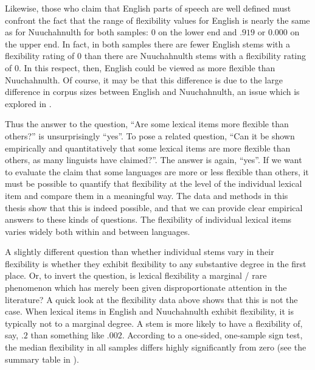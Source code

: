 Likewise, those who claim that English parts of speech are well defined must confront the fact that the range of flexibility values for English is nearly the same as for Nuuchahnulth for both samples: $0$ on the lower end and $.919$ or $0.000$ on the upper end. In fact, in both samples there are fewer English stems with a flexibility rating of $0$ than there are Nuuchahnulth stems with a flexibility rating of $0$. In this respect, then, English could be viewed as more flexible than Nuuchahnulth. Of course, it may be that this difference is due to the large difference in corpus sizes between English and Nuuchahnulth, an issue which is explored in .

Thus the answer to the question, \enquote{Are some lexical items more flexible than others?} is unsurprisingly \enquote{yes}. To pose a related question, \enquote{Can it be shown empirically and quantitatively that some lexical items are more flexible than others, as many linguists have claimed?}. The answer is again, \enquote{yes}. If we want to evaluate the claim that some languages are more or less flexible than others, it must be possible to quantify that flexibility at the level of the individual lexical item and compare them in a meaningful way. The data and methods in this thesis show that this is indeed possible, and that we can provide clear empirical answers to these kinds of questions. The flexibility of individual lexical items varies widely both within and between languages.

A slightly different question than whether individual stems vary in their flexibility is whether they exhibit flexibility to any substantive degree in the first place. Or, to invert the question, is lexical flexibility a marginal / rare phenomenon which has merely been given disproportionate attention in the literature? A quick look at the flexibility data above shows that this is not the case. When lexical items in English and Nuuchahnulth exhibit flexibility, it is typically not to a marginal degree. A stem is more likely to have a flexibility of, say, $.2$ than something like $.002$. According to a one-sided, one-sample sign test, the median flexibility in all samples differs highly significantly from zero (see the summary table in ).


